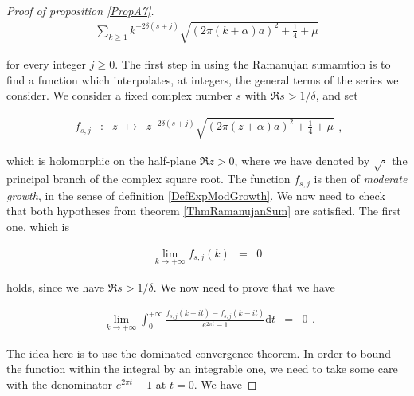 \documentclass{jams-l}
\theoremstyle{definition}
\theoremstyle{remark}
\numberwithin{equation}{section}
\begin{document}
\begin{proof}[Proof of proposition \ref{PropA7}]
                \[ \begin{array}{c}
                        \sum\limits_{k \geqslant 1} k^{-2 \delta \left( s + j \right)} \sqrt{\left( 2 \pi \left( k + \alpha \right) a \right)^2 + \frac{1}{4} + \mu}
                    \end{array} \]
                
                \noindent for every integer $j \geqslant 0$. The first step in using the Ramanujan sumamtion is to find a function which interpolates, at integers, the general terms of the series we consider. We consider a fixed complex number $s$ with $\Re s > 1 / \delta$, and set
                
                \[ \begin{array}{lllll}
                        f_{s,j} & : & z & \longmapsto & z^{-2 \delta \left( s + j \right)} \sqrt{\left( 2 \pi \left( z + \alpha \right) a \right)^2 + \frac{1}{4} + \mu}
                    \end{array} , \]
                
                \noindent which is holomorphic on the half-plane $\Re z > 0$, where we have denoted by $\sqrt{\cdot}$ the principal branch of the complex square root. The function $f_{s,j}$ is then of \textit{moderate growth}, in the sense of definition \ref{DefExpModGrowth}. We now need to check that both hypotheses from theorem \ref{ThmRamanujanSum} are satisfied. The first one, which is
                
                \[ \begin{array}{lll}
                        \lim\limits_{k \rightarrow + \infty} f_{s,j} \left( k \right) & = & 0
                    \end{array} \]
                
                \noindent holds, since we have $\Re s > 1 / \delta$. We now need to prove that we have
                
                \[ \begin{array}{lll}
                        \lim\limits_{k \rightarrow + \infty} \int_0^{+ \infty} \frac{f_{s,j} \left( k + i t \right) - f_{s,j} \left( k - i t \right)}{e^{2 \pi t} - 1} \mathrm{d}t & = & 0
                    \end{array} . \]
                
                \noindent The idea here is to use the dominated convergence theorem. In order to bound the function within the integral by an integrable one, we need to take some care with the denominator $e^{2 \pi t} - 1$ at $t = 0$. We have
                

\end{proof}
\end{document}
